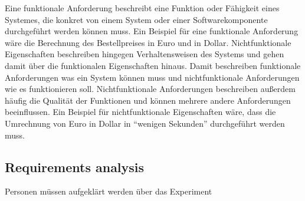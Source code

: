 Eine funktionale Anforderung beschreibt eine Funktion oder Fähigkeit eines Systemes, die konkret von einem System oder einer Softwarekomponente durchgeführt werden können muss.\autocite[Vgl.][S.35]{IEEE.1990} Ein Beispiel für eine funktionale Anforderung wäre die Berechnung des Bestellpreises in Euro und in Dollar. Nichtfunktionale Eigenschaften beschreiben hingegen Verhaltensweisen des Systems\autocite[Vgl.][Kapitel 3]{Seacord.2003} und gehen damit über die funktionalen Eigenschaften hinaus. Damit beschreiben funktionale Anforderungen was ein System können muss und nichtfunktionale Anforderungen wie es funktionieren soll. Nichtfunktionale Anforderungen beschreiben außerdem häufig die Qualität der Funktionen und können mehrere andere Anforderungen beeinflussen.\autocite[Vgl.][S.109ff]{Balzert.2011} Ein Beispiel für nichtfunktionale Eigenschaften wäre, dass die Umrechnung von Euro in Dollar in \enquote{wenigen Sekunden} durchgeführt werden muss.


\subsection{Requirements analysis}


Personen müssen aufgeklärt werden über das Experiment \cite{Dresch.2011}

